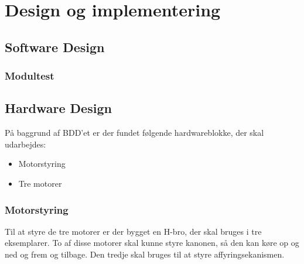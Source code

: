 \chapter{Design og implementering}


\section{Software Design}

\subsection{Modultest}



\section{Hardware Design}
På baggrund af BDD'et er der fundet følgende hardwareblokke, der skal udarbejdes: 
\begin{itemize}
	\item Motorstyring
	\item Tre motorer
\end{itemize}

\subsection{Motorstyring}
Til at styre de tre motorer er der bygget en H-bro, der skal bruges i tre eksemplarer. To af disse motorer skal kunne styre kanonen, så den kan køre op og ned og frem og tilbage. Den tredje skal bruges til at styre affyringsekanismen. 

